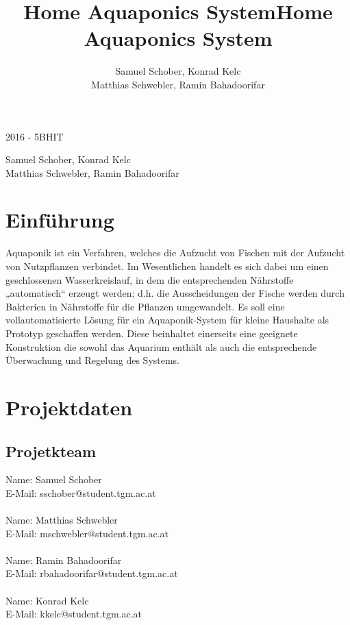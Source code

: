 \documentclass[11pt]{article}
\title{\textbf{Home Aquaponics System}}
\author{Samuel Schober, Konrad Kelc\\
		Matthias Schwebler, Ramin Bahadoorifar\\}
\date{}
\begin{document}
\maketitle
\begin{titlepage}
    \begin{center}
        \vspace*{1cm}
		\title{\textbf{Home Aquaponics System}}

        \vspace{2.5cm}

        2016 - 5BHIT

        \vspace*{5mm}

        \small{Samuel Schober, Konrad Kelc\\Matthias Schwebler, Ramin Bahadoorifar}

        \vspace*{2cm}

        \vfill

        \begin{center}
        \end{center}

    \end{center}
\end{titlepage}

\section{Einf\"uhrung}
Aquaponik ist ein Verfahren, welches die Aufzucht von Fischen mit der Aufzucht von Nutzpflanzen verbindet. Im Wesentlichen handelt es sich dabei um einen geschlossenen Wasserkreislauf, in dem die entsprechenden Nährstoffe „automatisch“ erzeugt werden; d.h. die Ausscheidungen der Fische werden durch Bakterien in N\"ahrstoffe f\"ur die Pflanzen umgewandelt. Es soll eine vollautomatisierte L\"osung f\"ur ein Aquaponik-System f\"ur kleine Haushalte als Prototyp geschaffen werden. Diese beinhaltet einerseits eine geeignete Konstruktion die sowohl das Aquarium enth\"alt als auch die entsprechende \"Uberwachung und Regelung des Systems.


\section{Projektdaten}

\subsection{Projetkteam}
Name: Samuel Schober \\
E-Mail: sschober@student.tgm.ac.at \\
\\Name: Matthias Schwebler \\
E-Mail: mschwebler@student.tgm.ac.at \\
\\Name: Ramin Bahadoorifar \\
E-Mail: rbahadoorifar@student.tgm.ac.at \\
\\Name: Konrad Kelc \\
E-Mail: kkelc@student.tgm.ac.at
\end{document}
